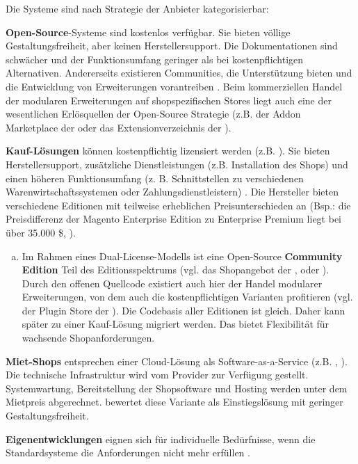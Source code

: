 \documentclass[12pt,a4paper,bibliography=totocnumbered,listof=totoc]{scrartcl}
\begin{document}
Die Systeme sind nach Strategie der Anbieter kategorisierbar:
\begin{compactitem}
\item \textbf{Open-Source}-Systeme sind kostenlos verfügbar. Sie bieten völlige Gestaltungsfreiheit, aber keinen Herstellersupport. Die Dokumentationen sind schwächer und der Funktionsumfang geringer als bei kostenpflichtigen Alternativen. Andererseits existieren Communities, die Unterstützung bieten und die Entwicklung von Erweiterungen vorantreiben \citep{stahl15}. Beim kommerziellen Handel der modularen Erweiterungen auf shopspezifischen Stores liegt auch eine der wesentlichen Erlösquellen der Open-Source Strategie (z.B. der Addon Marketplace der \citeauthor{prestashopAddons} oder das Extensionverzeichnis der \citeauthor{opencartExtensions}).
\item \textbf{Kauf-Lösungen} können kostenpflichtig lizensiert werden (z.B. \citeauthor{shopwarePricing}). Sie bieten Herstellersupport, zusätzliche Dienstleistungen (z.B. Installation des Shops) und einen höheren Funktionsumfang (z. B. Schnittstellen zu verschiedenen Warenwirtschaftssystemen oder Zahlungsdienstleistern) \citep{stahl15}. Die Hersteller bieten verschiedene Editionen mit teilweise erheblichen Preisunterschieden an (Bsp.: die Preisdifferenz der Magento Enterprise Edition zu Enterprise Premium liegt bei über 35.000 \$, \citealp[vgl][]{fwpShop}).
\begin{enumerate}[a.]
\item Im Rahmen eines Dual-License-Modells ist eine Open-Source \textbf{Community Edition} Teil des Editionsspektrums \citep{t3n14} (vgl. das Shopangebot der \citeauthor{magentoShops}, \citeauthor{shopwarePricing} oder \citeauthor{oxidShops}). Durch den offenen Quellcode existiert auch hier der Handel modularer Erweiterungen, von dem auch die kostenpflichtigen Varianten profitieren (vgl. der Plugin Store der \citeauthor{shopwarePluginStore}). Die Codebasis aller Editionen ist gleich. Daher kann später zu einer Kauf-Lösung migriert werden. Das bietet Flexibilität für wachsende Shopanforderungen.
\end{enumerate}
\item \textbf{Miet-Shops} entsprechen einer Cloud-Lösung als Software-as-a-Service (z.B. \citeauthor{stratoWebshops}, \citeauthor{shopify15}). Die technische Infrastruktur wird vom Provider zur Verfügung gestellt. Systemwartung, Bereitstellung der Shopsoftware und Hosting werden unter dem Mietpreis abgerechnet. \citet{stahl15} bewertet diese Variante als Einstiegslösung mit geringer Gestaltungsfreiheit.
\item \textbf{Eigenentwicklungen} eignen sich für individuelle Bedürfnisse, wenn die Standardsysteme die Anforderungen nicht mehr erfüllen \citep{stahl15, graf14}.
\end{compactitem}
\end{document}
